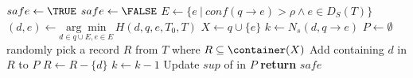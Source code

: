 \begin{algorithm}
\caption{$\SanitizeBuffer(T_0, T, B, H)$}
\label{algo:sanitize}
\begin{algorithmic}[1]
\STATE $safe \leftarrow \TRUE$
\label{algo:pick_rs}
    \STATE $safe \leftarrow \FALSE$
    \STATE $E \gets \{e ~|~ conf(q \rightarrow e) > \rho \land  e \in D_S(T)\}$
        \STATE $(d, e) \gets\underset{d\in q\cup E, e \in E}{\arg\min}\, H(d, q, e, T_0, T)$
        \label{algo:heur_dist}
    \STATE $X\leftarrow q\cup\{e\}$
    \STATE $k\leftarrow N_s(d,q \rightarrow e)$\label{line:sanitize-k}
    \STATE $P\leftarrow \emptyset$
    \label{line:sanitize-whilek}
        \STATE randomly pick a record $R$ from $T$ where
		$R\subseteq \container(X)$ \label{pick_row}
        \STATE Add \qids containing $d$ in $R$ to $P$
        \STATE $R\leftarrow R-\{d\}$\label{line:sanitize-suppress}
        \STATE $k \leftarrow k-1$
    \ENDWHILE
    \STATE Update $sup$ of \qids in $P$ \label{algo:update_kl}
\ENDWHILE \label{algo:pick_re}
\STATE \textbf{return} $safe$
\end{algorithmic}
\end{algorithm}

%
%

